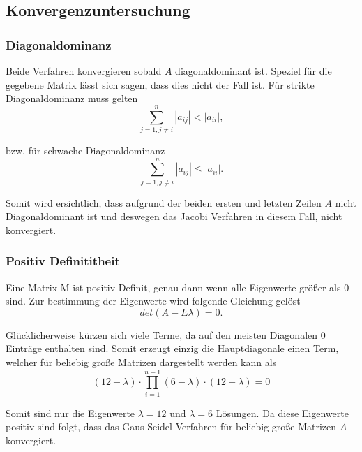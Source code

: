 \documentclass[12pt,titlepage]{article}
\begin{document}
	\subsection{Konvergenzuntersuchung}
		
		\subsubsection{Diagonaldominanz}
			Beide Verfahren konvergieren sobald $A$ diagonaldominant ist. Speziel
			für die gegebene Matrix lässt sich sagen, dass dies nicht der Fall ist.
			Für strikte Diagonaldominanz muss gelten
			\begin{equation*}
				\sum_{j = 1, j \neq i}^{n} |a_{ij}| < |a_{ii}|,
			\end{equation*}
		
			bzw. für schwache Diagonaldominanz
			\begin{equation*}
				\sum_{j = 1, j \neq i}^{n} |a_{ij}| \leq |a_{ii}|.
			\end{equation*}
		
			Somit wird ersichtlich, dass aufgrund der beiden ersten und letzten Zeilen
			$A$ nicht Diagonaldominant ist und deswegen das Jacobi Verfahren in diesem Fall, nicht
			konvergiert.

		\subsubsection{Positiv Definititheit}
		
			Eine Matrix M ist positiv Definit, genau dann wenn alle Eigenwerte größer als $0$ sind. Zur bestimmung der Eigenwerte wird folgende Gleichung gelöst
			\begin{equation*}
				det(A - E\lambda) = 0.
			\end{equation*}
			
			Glücklicherweise kürzen sich viele Terme, da auf den meisten Diagonalen $0$ Einträge enthalten sind. Somit erzeugt einzig die Hauptdiagonale einen Term, welcher für beliebig große Matrizen
			dargestellt werden kann als
			\begin{equation*}
				(12-\lambda)\cdot\prod_{i=1}^{n-1}(6-\lambda) \cdot (12-\lambda) = 0 
			\end{equation*}
			
			Somit sind nur die Eigenwerte $\lambda = 12$ und $\lambda = 6$ Lösungen. Da diese Eigenwerte positiv sind folgt, dass das Gaus-Seidel Verfahren für beliebig große Matrizen $A$ konvergiert.
			
\end{document}
